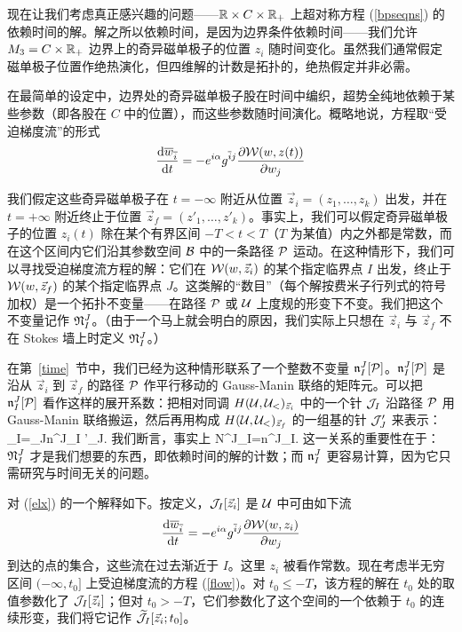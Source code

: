 现在让我们考虑真正感兴趣的问题——$\R\times C\times \R_+$ 上超对称方程 (\ref{bpseqns}) 的依赖时间的解。解之所以依赖时间，是因为边界条件依赖时间——我们允许 $\Mthree=C\times \R_+$ 边界上的奇异磁单极子的位置 $z_i$ 随时间变化。虽然我们通常假定磁单极子位置作绝热演化，但四维解的计数是拓扑的，绝热假定并非必需。



在最简单的设定中，边界处的奇异磁单极子股在时间中编织，超势全纯地依赖于某些参数（即各股在 $C$ 中的位置），而这些参数随时间演化。概略地说，方程取“受迫梯度流”的形式
\begin{equation} \label{flow}
\frac{\d \bar w_{\bar i}}{\d t} = -e^{i \alpha} g^{\bar i j}  \frac{\partial \W(w,z(t))}{\partial w_j}
\end{equation}

我们假定这些奇异磁单极子在 $t=-\infty$ 附近从位置 $\vec z_i=(z_{1},\dots,z_{k})$ 出发，并在 $t=+\infty$ 附近终止于位置 $\vec z_f=(z'_{1},\dots,z'_{k})$。事实上，我们可以假定奇异磁单极子的位置 $z_i(t)$ 除在某个有界区间 $-T<t<T$（$T$ 为某值）内之外都是常数，而在这个区间内它们沿其参数空间 $\ZZ$ 中的一条路径 $\P$ 运动。在这种情形下，我们可以寻找受迫梯度流方程的解：它们在 $\W(w,\vec z_i)$ 的某个指定临界点 $I$ 出发，终止于 $\W(w,\vec z_f)$ 的某个指定临界点 $J$。这类解的“数目”（每个解按费米子行列式的符号加权）是一个拓扑不变量——在路径 $\P$ 或 $\U$ 上度规的形变下不变。我们把这个不变量记作 $\frak N^J_I$。（由于一个马上就会明白的原因，我们实际上只想在 $\vec z_i$ 与 $\vec z_f$ 不在 Stokes 墙上时定义 $\frak N^J_I$。）

在第~\ref{time}~节中，我们已经为这种情形联系了一个整数不变量 $\frak n^J_I[\P]$。$\frak n^J_I[\P]$ 是沿从 $\vec z_i$ 到 $\vec z_f$ 的路径 $\P$ 作平行移动的 Gauss-Manin 联络的矩阵元。可以把 $\frak n^J_I[\P]$ 看作这样的展开系数：把相对同调 $H(\U,\U_<)_{\vec z_i}$ 中的一个针 $\J_I$ 沿路径 $\P$ 用 Gauss-Manin 联络搬运，然后再用构成 $H(\U,\U_<)_{\vec z_f}$ 的一组基的针 $\J'_J$ 来表示：
\be\label{zelx}\J_I=\sum_J\frak n^J_I \J'_J.\ee
我们断言，事实上
\be\label{elx}\frak N^J_I=\frak n^J_I.\ee
这一关系的重要性在于：$\frak N^J_I$ 才是我们想要的东西，即依赖时间的解的计数；而 $\frak n^J_I$ 更容易计算，因为它只需研究与时间无关的问题。



 
对 (\ref{elx}) 的一个解释如下。按定义，$\J_I[\vec z_i] $ 是 $\U$ 中可由如下流
\begin{equation}
\frac{\d \bar w_{\bar i}}{\d t} = -e^{i \alpha} g^{\bar i j}  \frac{\partial \W(w,z_i)}{\partial w_j}
\end{equation}
到达的点的集合，这些流在过去渐近于 $I$。这里 $z_i$ 被看作常数。现在考虑半无穷区间 $(-\infty,t_0]$ 上受迫梯度流的方程 (\ref{flow})。对 $t_0\leq -T$，该方程的解在 $t_0$ 处的取值参数化了 $\J_I[\vec z_i]$；但对 $t_0>-T$，它们参数化了这个空间的一个依赖于 $t_0$ 的连续形变，我们将它记作 $\tilde \J_I[\vec z_i;t_0]$。

